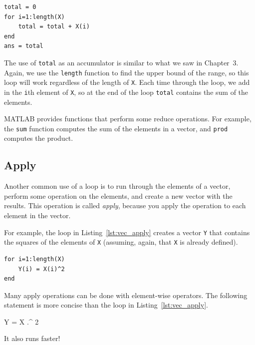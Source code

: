 \begin{lstlisting}[caption={Reducing a vector to a single scalar value (the sum)}, label={lst:vec_reduce}]
total = 0
for i=1:length(X)
    total = total + X(i)
end
ans = total
\end{lstlisting}

The use of \lstinline{total} as an accumulator is similar to what we
saw in Chapter~3.  Again, we use the \lstinline{length} function
to find the upper bound of the range, so this loop will work
regardless of the length of \lstinline{X}.
Each time through the loop, we add
in the \lstinline{i}th element of \lstinline{X}, so at the end of the loop
\lstinline{total} contains the sum of the elements.


MATLAB provides functions that perform some reduce operations.
For example, the \lstinline{sum} function computes the sum of the elements
in a vector, and \lstinline{prod} computes the product.


\subsection{Apply}
\label{apply}

Another common use of a loop is to run through the elements of
a vector, perform some operation on the elements, and create
a new vector with the results.  This operation is called
\emph{apply}, because you apply the operation to each element in
the vector.


For example, the loop in Listing~\ref{lst:vec_apply} creates a vector \lstinline{Y} that
contains the squares of the elements of \lstinline{X} (assuming, again, that \lstinline{X} is already defined).

\begin{lstlisting}[caption={Making a new vector Y by squaring the elements in X}, label={lst:vec_apply}]
for i=1:length(X)
    Y(i) = X(i)^2
end
\end{lstlisting}

Many apply operations can be done with element-wise operators.
The following statement is more concise than the loop in
Listing~\ref{lst:vec_apply}.

\begin{code}
Y = X .^ 2
\end{code}

It also runs faster!


